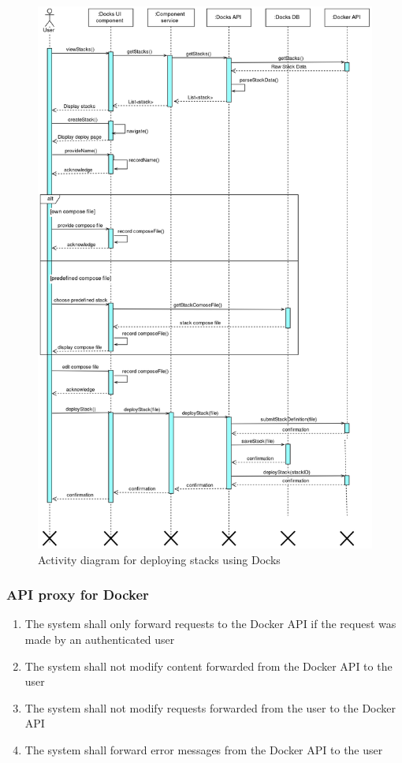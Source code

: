 \documentclass[]{article}
\newcommand{\docker}{Docker }
\begin{document}
\begin{figure}[H]
	\centering
	\includegraphics[width=\textwidth,height=\textheight,keepaspectratio]{uml/deploy-stack-activity-diagram.png}
	\caption{Activity diagram for deploying stacks using Docks}
\end{figure}

\subsubsection{API proxy for Docker}
\begin{enumerate}[label*=R4.\arabic*]
	\item The system shall only forward requests to the \docker API if the request was made by an authenticated user
	\item The system shall not modify content forwarded from the \docker API to the user
	\item The system shall not modify requests forwarded from the user to the \docker API
	\item The system shall forward error messages from the \docker API to the user
\end{enumerate}
\end{document}

